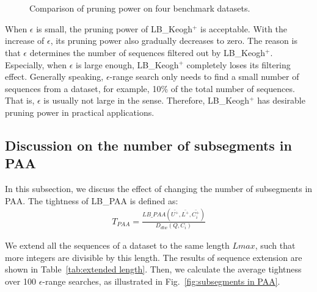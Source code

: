 \documentclass[10pt,journal,compsoc]{IEEEtran}
\begin{document}
\begin{figure*}[!htbp]
\centering
{}
~~~~~~\\
~~~~~~
\caption{Comparison of pruning power on four benchmark datasets.}
\label{fig:comparison of pruning power}
\end{figure*}

When $\epsilon$ is small, the pruning power of LB\_Keogh$^+$ is acceptable.
With the increase of $\epsilon$, its pruning power also gradually decreases to zero.
The reason is that $\epsilon$ determines the number of sequences filtered out by LB\_Keogh$^+$.
Especially, when $\epsilon$ is large enough, LB\_Keogh$^+$ completely loses its filtering effect.
Generally speaking, $\epsilon$-range search only needs to find a small number of sequences from a dataset,
for example, 10\% of the total number of sequences.
That is, $\epsilon$ is usually not large in the sense.
Therefore, LB\_Keogh$^+$ has desirable pruning power in practical applications.



\subsection{Discussion on the number of subsegments in PAA}

In this subsection, we discuss the effect of changing the number of subsegments in PAA.
The tightness of LB\_{PAA} is defined as:
\begin{equation}\label{eq:tightness_paa}
\begin{split}
	T_{PAA} = \frac{LB\_{PAA}(\bar{U^+},\bar{L^+},\bar{C_i^+})}{D_{dtw}(Q,C_i)}
\end{split}
\end{equation}

We extend all the sequences of a dataset to the same length $Lmax$,
such that more integers are divisible by this length.
The results of sequence extension are shown in Table~\ref{tab:extended length}.
Then, we calculate the average tightness over 100 $\epsilon$-range searches,
as illustrated in Fig.~\ref{fig:subsegments in PAA}.
\end{document}
